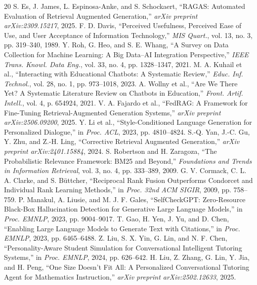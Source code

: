 \documentclass[conference]{IEEEtran}
\begin{document}
\begin{thebibliography}{20}
S. Es, J. James, L. Espinosa-Anke, and S. Schockaert,
``RAGAS: Automated Evaluation of Retrieval Augmented Generation,''
\textit{arXiv preprint arXiv:2309.15217}, 2025.
F. D. Davis, ``Perceived Usefulness, Perceived Ease of Use, and User
Acceptance of Information Technology,'' \textit{MIS Quart.}, vol. 13,
no. 3, pp. 319--340, 1989.
Y. Roh, G. Heo, and S. E. Whang, ``A Survey on Data Collection for
Machine Learning: A Big Data--AI Integration Perspective,''
\textit{IEEE Trans. Knowl. Data Eng.}, vol. 33, no. 4,
pp. 1328--1347, 2021.
M. A. Kuhail et al., ``Interacting with Educational Chatbots: A
Systematic Review,'' \textit{Educ. Inf. Technol.}, vol. 28, no. 1,
pp. 973--1018, 2023.
A. Wollny et al., ``Are We There Yet? A Systematic Literature Review on
Chatbots in Education,'' \textit{Front. Artif. Intell.}, vol. 4,
p. 654924, 2021.
V. A. Fajardo et al., ``FedRAG: A Framework for Fine-Tuning
Retrieval-Augmented Generation Systems,''
\textit{arXiv preprint arXiv:2506.09200}, 2025.
Y. Li et al., ``Style-Conditioned Language Generation for Personalized
Dialogue,'' in \textit{Proc. ACL}, 2023, pp. 4810--4824.
S.-Q. Yan, J.-C. Gu, Y. Zhu, and Z.-H. Ling, ``Corrective Retrieval
Augmented Generation,'' \textit{arXiv preprint arXiv:2401.15884}, 2024.
S. Robertson and H. Zaragoza, ``The Probabilistic Relevance Framework: BM25
and Beyond,'' \textit{Foundations and Trends in Information Retrieval},
vol. 3, no. 4, pp. 333--389, 2009.
G. V. Cormack, C. L. A. Clarke, and S. B\"{u}ttcher, ``Reciprocal Rank Fusion
Outperforms Condorcet and Individual Rank Learning Methods,'' in
\textit{Proc. 32nd ACM SIGIR}, 2009, pp. 758--759.
P. Manakul, A. Liusie, and M. J. F. Gales, ``SelfCheckGPT: Zero-Resource
Black-Box Hallucination Detection for Generative Large Language Models,'' in
\textit{Proc. EMNLP}, 2023, pp. 9004--9017.
T. Gao, H. Yen, J. Yu, and D. Chen, ``Enabling Large Language Models to
Generate Text with Citations,'' in \textit{Proc. EMNLP}, 2023,
pp. 6465--6488.
Z. Liu, S. X. Yin, G. Lin, and N. F. Chen, ``Personality-Aware Student
Simulation for Conversational Intelligent Tutoring Systems,'' in
\textit{Proc. EMNLP}, 2024, pp. 626--642.
H. Liu, Z. Zhang, G. Lin, Y. Jia, and H. Peng, ``One Size Doesn't Fit All: A
Personalized Conversational Tutoring Agent for Mathematics Instruction,''
\textit{arXiv preprint arXiv:2502.12633}, 2025.
\end{thebibliography}
\end{document}
